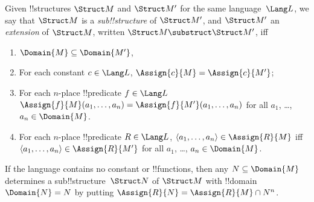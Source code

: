 \documentclass[../../include/open-logic-section]{subfiles}
\begin{document}

\begin{defn}
Given !!{structure}s $\Struct M$ and $\Struct M'$ for the same
language~$\Lang L$, we say that $\Struct M$ is a \emph{sub!!{structure}}
of $\Struct M'$, and $\Struct M'$ an \emph{extension} of $\Struct M$,
written $\Struct M \substruct \Struct M'$, iff
\begin{enumerate}
\item $\Domain{M} \subseteq \Domain{M'}$,
\item For each constant $c \in \Lang L$, $\Assign{c}{M} =
    \Assign{c}{M'}$;
\item For each $n$-place !!{predicate} $f \in \Lang L$
  $\Assign{f}{M}(a_1, \dots, a_n) = \Assign{f}{M'}(a_1, \dots, a_n)$
  for all $a_1$, \dots, $a_n \in \Domain{M}$.
\item For each $n$-place !!{predicate} $R \in \Lang L$, $\langle
  a_1, \dots, a_n\rangle \in \Assign{R}{M}$ iff $\langle a_1, \dots,
  a_n\rangle \in \Assign{R}{M'}$ for all $a_1$, \dots, $a_n \in
  \Domain{M}$.
\end{enumerate}
\end{defn}

\begin{rem}
If the language contains no constant or !!{function}s, then any $N
\subseteq \Domain{M}$ determines a sub!!{structure}~$\Struct N$ of
$\Struct M$ with !!{domain}~$\Domain{N} = N$ by putting $\Assign{R}{N} =
\Assign{R}{M} \cap N^n$.
\end{rem}

\end{document}
